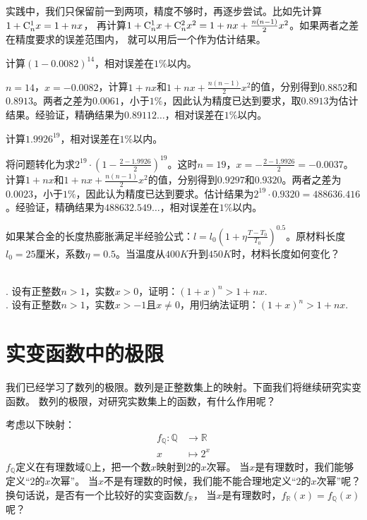\documentclass[12pt,UTF8]{ctexbook}
\begin{document}
实践中，我们只保留前一到两项，精度不够时，再逐步尝试。比如先计算$1 + \mathrm{C}_{n}^{1}x = 1 + nx$，
再计算$1 + \mathrm{C}_{n}^{1}x + \mathrm{C}_{n}^{2}x^2 = 1 + nx + \frac{n(n-1)}{2}x^2$。如果两者之差在精度要求的误差范围内，
就可以用后一个作为估计结果。
\begin{et}
    计算$(1 - 0.0082)^{14}$，相对误差在$1\%$以内。
\end{et}
\begin{so}
    $n=14$，$x=-0.0082$，计算$1 + nx$和$1 + nx + \frac{n(n-1)}{2}x^2$的值，分别得到$0.8852$和$0.8913$。两者之差为$0.0061$，小于$1\%$，因此认为精度已达到要求，取$0.8913$为估计结果。经验证，精确结果为$0.89112\dots$，相对误差在$1\%$以内。
\end{so}
\begin{et}
    计算$1.9926^{19}$，相对误差在$1\%$以内。
\end{et}
\begin{so}
    将问题转化为求$2^{19}\cdot\left(1-\frac{2-1.9926}{2}\right)^{19}$。这时$n=19$，$x = -\frac{2-1.9926}{2} = -0.0037$。计算$1 + nx$和$1 + nx + \frac{n(n-1)}{2}x^2$的值，分别得到$0.9297$和$0.9320$。两者之差为$0.0023$，小于$1\%$，因此认为精度已达到要求。估计结果为$2^{19}\cdot 0.9320=488636.416$。经验证，精确结果为$488632.549\dots$，相对误差在$1\%$以内。
\end{so}

\begin{sk}
    如果某合金的长度热膨胀满足半经验公式：$l = l_0(1+\eta\frac{T-T_0}{T_0})^{0.5}$。原材料长度$l_0=25$厘米，系数$\eta=0.5$。当温度从$400K$升到$450K$时，材料长度如何变化？
\end{sk}

\begin{xt}
    \mbox{} \\
    . 设有正整数$n > 1$，实数$x > 0$，证明：$(1 + x)^n > 1 + nx.$\\
    . 设有正整数$n > 1$，实数$x > -1$且$x \neq 0$，用归纳法证明：$(1 + x)^n > 1 + nx.$
\end{xt}

\chapter{实变函数中的极限}
我们已经学习了数列的极限。数列是正整数集上的映射。下面我们将继续研究实变函数。
数列的极限，对研究实数集上的函数，有什么作用呢？

考虑以下映射：
\begin{align*}
    f_{\mathbb{Q}}: \mathbb{Q} &\rightarrow \mathbb{R} \\
    x &\mapsto 2^x 
\end{align*}
$f_{\mathbb{Q}}$定义在有理数域$\mathbb{Q}$上，把一个数$x$映射到$2$的$x$次幂。
当$x$是有理数时，我们能够定义“$2$的$x$次幂”。
当$x$不是有理数的时候，我们能不能合理地定义“$2$的$x$次幂”呢？换句话说，是否有一个比较好的实变函数$f_{\mathbb{R}}$，
当$x$是有理数时，$f_{\mathbb{R}}(x) = f_{\mathbb{Q}}(x)$呢？
\end{document}
